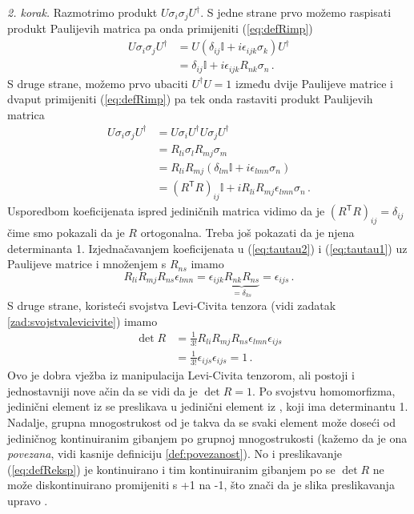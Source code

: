 \emph{2. korak.} 
Razmotrimo produkt \( U \sigma_i \sigma_j U^\dagger \).  S jedne strane prvo
možemo raspisati produkt Paulijevih matrica pa onda primijeniti (\ref{eq:defRimp}) 
\begin{align}
    U \sigma_i \sigma_j U^\dagger& =  U \left(
        \delta_{ij} \mathbb{I} + i \epsilon_{ijk}\sigma_{k} \right) U^\dagger \\
                                 & = \delta_{ij} \mathbb{I} + i \epsilon_{ijk}
                                 R_{nk} \sigma_n \,.
                                 \label{eq:tautau1}
\end{align}
S druge strane, možemo prvo ubaciti $U^\dagger U = 1$ između dvije Paulijeve
matrice i dvaput primijeniti (\ref{eq:defRimp}) pa tek onda rastaviti produkt
Paulijevih matrica
\begin{align}
    U \sigma_i \sigma_j U^\dagger& =  U \sigma_i U^\dagger U \sigma_j U^\dagger \\
                                 & = R_{li} \sigma_{l} R_{mj} \sigma_{m} \\
                                 & = R_{li} R_{mj} \left(
        \delta_{lm} \mathbb{I} + i \epsilon_{lmn}\sigma_{n} \right) \\
                                 & = (R^{\mathsf{T}} R)_{ij} \mathbb{I}
                     + i R_{li} R_{mj}\epsilon_{lmn}\sigma_{n} \,.
                                 \label{eq:tautau2}
\end{align}
Usporedbom koeficijenata ispred jediničnih matrica vidimo da je
$(R^{\mathsf{T}} R)_{ij} = \delta_{ij}$ čime smo pokazali da je $R$ ortogonalna.
Treba još pokazati da je njena determinanta 1. Izjednačavanjem
koeficijenata u (\ref{eq:tautau2})  i (\ref{eq:tautau1}) uz Paulijeve matrice
i množenjem s $R_{ns}$ imamo
\begin{equation}
    R_{li} R_{mj}R_{ns}\epsilon_{lmn} = \epsilon_{ijk} \underbrace{R_{nk} R_{ns}}_{=\delta_{ks}}
    = \epsilon_{ijs} \,.
\end{equation}
S druge strane, koristeći svojstva Levi-Civita tenzora (vidi zadatak \ref{zad:svojstvalevicivite})
imamo
\begin{align}
 \det R& = \frac{1}{3!} R_{li} R_{mj}R_{ns} \epsilon_{lmn} \epsilon_{ijs}  \\
       & = \frac{1}{3!} \epsilon_{ijs}\epsilon_{ijs} = 1\,.
\end{align}
Ovo je dobra vježba iz manipulacija Levi-Civita tenzorom, ali postoji i jednostavniji
nove ačin da se vidi da je $\det R = 1$. 
Po svojstvu homomorfizma, jedinični element iz  se preslikava u jedinični
element iz , koji ima determinantu 1.
Nadalje, grupna mnogostrukost od  je takva da se
svaki element može doseći od jediničnog kontinuiranim gibanjem po grupnoj mnogostrukosti
(kažemo da je ona \emph{povezana}, vidi kasnije definiciju \ref{def:povezanost}).
 
No i preslikavanje (\ref{eq:defReksp}) je kontinuirano i tim kontinuiranim gibanjem
po  se $\det R$ ne može diskontinuirano promijeniti s +1 na -1, što znači da je slika
preslikavanja upravo .

